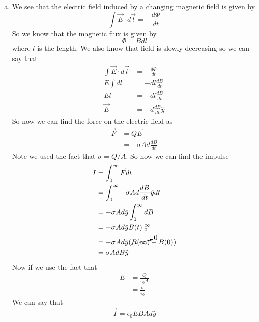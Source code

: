 \documentclass[11pt]{article}
\numberwithin{equation}{section}
\newcommand{\dl}{d\vec{l}}
\begin{document}
\begin{enumerate}[(a)]
\item
We see that the electric field induced by a changing magnetic field is given by
\begin{equation}
\int\vec{E}\cdot\dl = -\frac{d\Phi}{dt}
\label{Fara}
\end{equation}
So we know that the magnetic flux is given by
$$\Phi = Bdl$$
where $l$ is the length. We also know that field is slowly decreasing so we can say that 
\begin{align*}
\int\vec{E}\cdot\dl &= -\frac{d\Phi}{dt}\\
E\int dl &= -dl\frac{dB}{dt}\\
El &= -dl\frac{dB}{dt}\\
\vec{E} &= -d\frac{dB}{dt}\hat{y}
\end{align*}
So now we can find the force on the electric field as
\begin{align*}
\vec{F} &= Q\vec{E}\\
&= -\sigma Ad\frac{dB}{dt}
\end{align*}
Note we used the fact that $\sigma = Q/A$. So now we can find the impulse
\begin{align*}
I &= \int_0^{\infty}\vec{F}dt\\
&= \int_0^{\infty}-\sigma Ad\frac{dB}{dt}\hat{y}dt\\
&= -\sigma Ad\hat{y}\int_0^{\infty}dB\\
&= -\sigma Ad\hat{y}B(t)|_0^{\infty}\\
&= -\sigma Ad\hat{y}(\cancelto{0}{B(\infty)}-B(0))\\
&= \sigma AdB\hat{y}
\end{align*}
Now if we use the fact that
\begin{align*}
E &= \frac{Q}{\epsilon_0 A}\\
&= \frac{\sigma}{\epsilon_0}
\end{align*}
We can say that
$$\vec{I} = \epsilon_0 EBAd\hat{y}$$
\end{enumerate}
\end{document}
